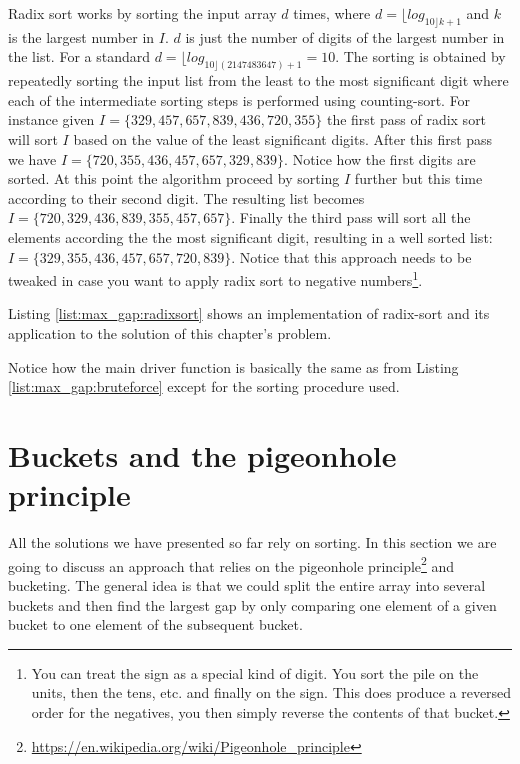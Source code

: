 Radix sort works by sorting the input array $d$ times, where $d = \lfloor log_{10 \rfloor k+1}$ and $k$ is
the largest number in $I$. $d$ is just the number of digits of the largest number in the list. For a
standard  $d=\lfloor log_{10 \rfloor(2147483647) + 1}=10$. The sorting is obtained by repeatedly
sorting the input list from the least to the most significant digit where each of the intermediate
sorting steps is performed using counting-sort. For instance given $I =
\{329,457,657,839,436,720,355\}$ the first pass of radix sort will sort $I$ based on the value of
the least significant digits. After this first pass we have $I=\{720,355,436,457,657,329,839\}$.
Notice how the first digits are sorted. At this point the algorithm proceed by sorting $I$ further
but this time according to their second digit. The resulting list becomes
$I=\{720,329,436,839,355,457,657\}$. Finally the third pass will sort all the elements according the
the most significant digit, resulting in a well sorted list: $I=\{329,355,436,457,657,720,839\}$.
Notice that this approach needs to be tweaked in case you want to apply radix sort to negative
numbers\footnote{You can treat the sign as a special kind of digit. You sort the pile on the units,
then the tens, etc. and finally on the sign. This does produce a reversed order for the negatives,
you then simply reverse the contents of that bucket.}.

Listing \ref{list:max_gap:radixsort} shows an implementation of radix-sort and its application to
the solution of this chapter's problem.

Notice how the main driver function  is basically the same as
 from Listing \ref{list:max_gap:bruteforce} except for the sorting
procedure used.

\section{Buckets and the pigeonhole principle}
\label{max_gap:sec:buckets}
All the solutions we have presented so far rely on sorting. In this section we are going to discuss
an approach that relies on  the pigeonhole
principle\footnote{\url{https://en.wikipedia.org/wiki/Pigeonhole_principle}} and bucketing. The
general idea is that we could split the entire array into several buckets and then find the largest
gap by only comparing one element of a given bucket to one element of the subsequent bucket. 

